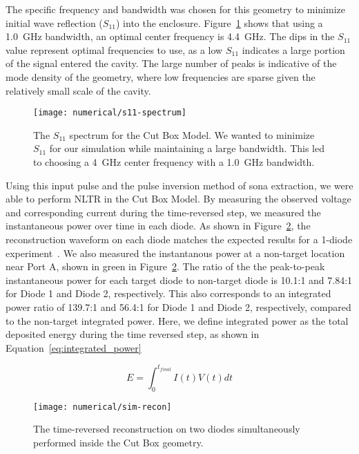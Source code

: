 The specific frequency and bandwidth was chosen for this geometry to minimize initial wave reflection ($S_{11}$) into the enclosure. Figure~\ref{fig:numerical-s11-spectrum} shows that using a 1.0~GHz bandwidth, an optimal center frequency is 4.4~GHz. The dips in the $S_{11}$ value represent optimal frequencies to use, as a low $S_{11}$ indicates a large portion of the signal entered the cavity. The large number of peaks is indicative of the mode density of the geometry, where low frequencies are sparse given the relatively small scale of the cavity.

\begin{figure}[t]
\centering
\texttt{[image: numerical/s11-spectrum]}
\caption[$S_{11}$ spectrum of the Cut Box Model]{The $S_{11}$ spectrum for the Cut Box Model. We wanted to minimize $S_{11}$ for our simulation while maintaining a large bandwidth. This led to choosing a 4~GHz center frequency with a 1.0~GHz bandwidth.}
\label{fig:numerical-s11-spectrum}
\end{figure}

Using this input pulse and the pulse inversion method of sona extraction, we were able to perform NLTR in the Cut Box Model. By measuring the observed voltage and corresponding current during the time-reversed step, we measured the instantaneous power over time in each diode. As shown in Figure~\ref{fig:numerical-sim-recon}, the reconstruction waveform on each diode matches the expected results for a 1-diode experiment~\cite{taddese_sensing_2010,barbieri_time_2010}. We also measured the instantanous power at a non-target location near Port A, shown in green in Figure~\ref{fig:numerical-sim-recon}. The ratio of the the peak-to-peak instantaneous power for each target diode to non-target diode is 10.1:1 and 7.84:1 for Diode 1 and Diode 2, respectively. This also corresponds to an integrated power ratio of 139.7:1 and 56.4:1 for Diode 1 and Diode 2, respectively, compared to the non-target integrated power. Here, we define integrated power as the total deposited energy during the time reversed step, as shown in Equation~\ref{eq:integrated_power}

\begin{equation}
E = \int_{0}^{t_{final}} I(t)V(t)dt
\label{eq:integrated_power}
\end{equation}

\begin{figure}[t]
\centering
\texttt{[image: numerical/sim-recon]}
\caption[Simultaneous reconstructions on two diodes]{The time-reversed reconstruction on two diodes simultaneously performed inside the Cut Box geometry.}
\label{fig:numerical-sim-recon}
\end{figure}

